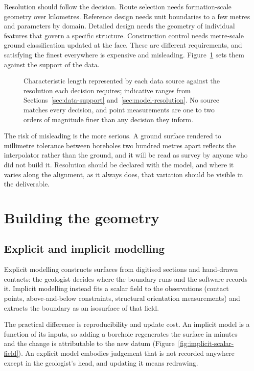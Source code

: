Resolution should follow the decision. Route selection needs formation-scale
geometry over kilometres. Reference design needs unit boundaries to a few
metres and parameters by domain. Detailed design needs the geometry of
individual features that govern a specific structure. Construction control
needs metre-scale ground classification updated at the face. These are
different requirements, and satisfying the finest everywhere is expensive and
misleading. Figure~\ref{fig:support-scale} sets them against the support of
the data.

\begin{figure}[htbp]
\centering
{}
\caption{Characteristic length represented by each data source against the resolution each decision requires; indicative ranges from Sections~\ref{sec:data-support} and~\ref{sec:model-resolution}. No source matches every decision, and point measurements are one to two orders of magnitude finer than any decision they inform.}
\label{fig:support-scale}
\end{figure}

The risk of misleading is the more serious. A ground surface rendered
to millimetre tolerance between boreholes two hundred metres apart reflects
the interpolator rather than the ground, and it will be read as
survey by anyone who did not build it. Resolution should be declared with the
model, and where it varies along the alignment, as it always does, that
variation should be visible in the deliverable.

\section{Building the geometry}
\label{sec:building-geometry}

\subsection{Explicit and implicit modelling}
\label{sec:implicit-modelling}

Explicit modelling constructs surfaces from digitised sections and hand-drawn
contacts: the geologist decides where the boundary runs and the software
records it. Implicit modelling instead fits a scalar field to the observations
(contact points, above-and-below constraints, structural orientation
measurements) and extracts the boundary as an isosurface of that field.

The practical difference is reproducibility and update cost. An implicit model
is a function of its inputs, so adding a borehole regenerates the surface in
minutes and the change is attributable to the new datum
(Figure~\ref{fig:implicit-scalar-field}). An explicit model
embodies judgement that is not recorded anywhere except in the geologist's
head, and updating it means redrawing.

